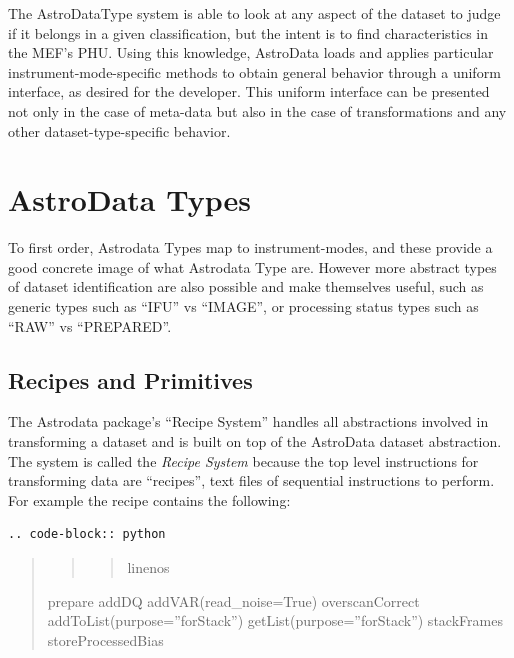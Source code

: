 \documentclass[letterpaper,10pt,english]{sphinxmanual}
\begin{document}
The AstroDataType system is able to look at any aspect of the dataset
to judge if it belongs in a given classification, but the intent is to
find characteristics in the MEF's PHU. Using this knowledge, AstroData
loads and applies particular instrument-mode-specific methods to
obtain general behavior through a uniform interface, as desired for
the developer. This uniform interface can be presented not only in the case
of meta-data but also in the case of transformations and any other
dataset-type-specific behavior.


\section{AstroData Types}
\label{gen.ADMANUAL_ADConcepts:astrodata-types}
To first order, Astrodata Types map to instrument-modes, and these
provide a good concrete image of what Astrodata Type are. However more
abstract types of dataset identification are also possible and make
themselves useful, such as generic types such as ``IFU'' vs ``IMAGE'', or
processing status types such as ``RAW'' vs ``PREPARED''.


\subsection{Recipes and Primitives}
\label{gen.ADMANUAL_ADConcepts:recipes-and-primitives}
The Astrodata package's ``Recipe System'' handles all abstractions
involved in transforming a dataset and is built on top of the
AstroData dataset abstraction. The system is called the \emph{Recipe
System} because the top level instructions for transforming data are
``recipes'', text files of sequential instructions to perform. For
example the recipe  contains the following:

\begin{Verbatim}[commandchars=@\[\]]
.. code-block:: python
\end{Verbatim}
\begin{quote}
\begin{quote}
\begin{quote}\begin{description}
\item[{linenos}] \leavevmode
\end{description}\end{quote}
\end{quote}

prepare
addDQ
addVAR(read\_noise=True)
overscanCorrect
addToList(purpose=''forStack'')
getList(purpose=''forStack'')
stackFrames
storeProcessedBias
\end{quote}
\end{document}
